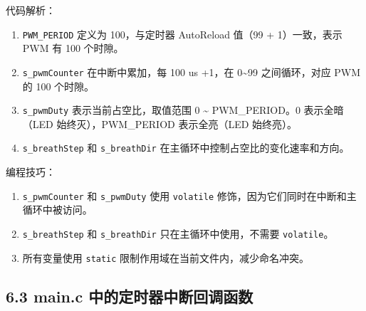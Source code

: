 \documentclass[
  chinese,
  UTF8,
  oneside,
  openany]{ctexbook}
\providecommand{\tightlist}{%
  \setlength{\itemsep}{0pt}\setlength{\parskip}{0pt}}
\begin{document}
代码解析：

\begin{enumerate}
\def\labelenumi{\arabic{enumi}.}
\tightlist
\item
  \texttt{PWM\_PERIOD} 定义为 100，与定时器 AutoReload 值（99 +
  1）一致，表示 PWM 有 100 个时隙。
\item
  \texttt{s\_pwmCounter} 在中断中累加，每 100 us +1，在
  0\textasciitilde99 之间循环，对应 PWM 的 100 个时隙。
\item
  \texttt{s\_pwmDuty} 表示当前占空比，取值范围 0 \textasciitilde{}
  PWM\_PERIOD。0 表示全暗（LED 始终灭），PWM\_PERIOD 表示全亮（LED
  始终亮）。
\item
  \texttt{s\_breathStep} 和 \texttt{s\_breathDir}
  在主循环中控制占空比的变化速率和方向。
\end{enumerate}

编程技巧：

\begin{enumerate}
\def\labelenumi{\arabic{enumi}.}
\tightlist
\item
  \texttt{s\_pwmCounter} 和 \texttt{s\_pwmDuty} 使用 \texttt{volatile}
  修饰，因为它们同时在中断和主循环中被访问。
\item
  \texttt{s\_breathStep} 和 \texttt{s\_breathDir}
  只在主循环中使用，不需要 \texttt{volatile}。
\item
  所有变量使用 \texttt{static} 限制作用域在当前文件内，减少命名冲突。
\end{enumerate}

\subsection{6.3 main.c
中的定时器中断回调函数}\label{main.c-ux4e2dux7684ux5b9aux65f6ux5668ux4e2dux65adux56deux8c03ux51fdux6570}
\end{document}
